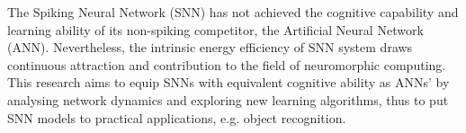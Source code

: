 % 
%
%

The Spiking Neural Network (SNN) has not achieved the cognitive capability and learning ability of its non-spiking competitor, the Artificial Neural Network (ANN).
Nevertheless, the intrinsic energy efficiency of SNN system draws continuous attraction and contribution to the field of neuromorphic computing.
This research aims to equip SNNs with equivalent cognitive ability as ANNs' by analysing network dynamics and exploring new learning algorithms, thus to put SNN models to practical applications, e.g. object recognition.

